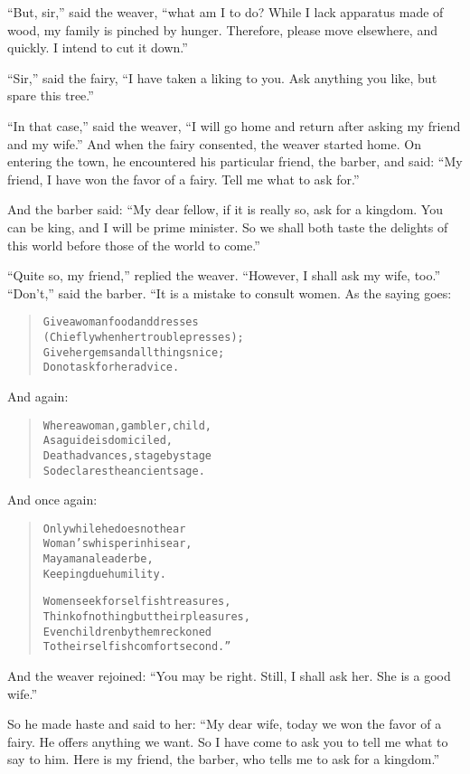 \documentclass[article, twoside, 14pt]{memoir}
\renewenvironment{verbatim}{%
\begin{quote}%
\vskip -10pt%
\begin{alltt}\normalfont\large}{\end{alltt}%
\end{quote}%
\vskip -10pt
} %
\begin{document}
``But, sir,'' said the weaver,
``what am I to do? While I lack apparatus made of wood, my family is pinched by hunger. Therefore, please move elsewhere, and quickly. I intend to cut it down.''

``Sir,'' said the fairy,
``I have taken a liking to you. Ask anything you like, but spare this tree.''

``In that case,'' said the weaver,
``I will go home and return after asking my friend and my wife.''
And when the fairy consented, the weaver started home. On entering
the town, he encountered his particular friend, the barber, and
said:
``My friend, I have won the favor of a fairy. Tell me what to ask for.''

And the barber said:
``My dear fellow, if it is really so, ask for a kingdom. You can be king, and I will be prime minister. So we shall both taste the delights of this world before those of the world to come.''

``Quite so, my friend,'' replied the weaver.
``However, I shall ask my wife, too.'' ``Don't,'' said the barber.
“It is a mistake to consult women. As the saying goes:

\begin{verbatim}
Give a woman food and dresses
(Chiefly when her trouble presses);
Give her gems and all things nice;
Do not ask for her advice.
\end{verbatim}
And again:

\begin{verbatim}
Where a woman, gambler, child,
As a guide is domiciled,
Death advances, stage by stage{\textemdash}
So declares the ancient sage.
\end{verbatim}
And once again:

\begin{verbatim}
Only while he does not hear
Woman's whisper in his ear,
May a man a leader be,
Keeping due humility.

Women seek for selfish treasures,
Think of nothing but their pleasures,
Even children by them reckoned
To their selfish comfort second.”
\end{verbatim}
And the weaver rejoined:
``You may be right. Still, I shall ask her. She is a good wife.''

So he made haste and said to her:
``My dear wife, today we won the favor of a fairy. He offers anything we want. So I have come to ask you to tell me what to say to him. Here is my friend, the barber, who tells me to ask for a kingdom.''
\end{document}
